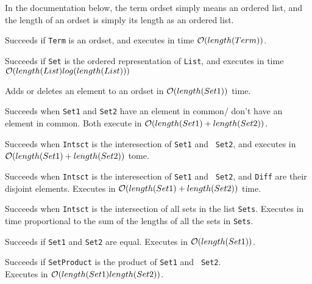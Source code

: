 In the documentation below, the term ordset simply means an ordered
list, and the length of an ordset is simply its length as an ordered
list.

\begin{description}
%
  Succeeds if {\tt Term} is an ordset, and executes in time
  ${\cal O}(length(Term))$.
  
%
Succeeds if {\tt Set} is the ordered representation of {\tt List}, and
executes in time ${\cal O}(length(List)log(length(List)))$

%
Adds or deletes an element to an ordset in  ${\cal O}(length(Set1))$
 time.

%
Succeeds when {\tt Set1} and {\tt Set2} have an element in common/
don't have an element in common.  Both execute in ${\cal O}(length(Set1) +
length(Set2))$.

%
Succeeds when {\tt Intsct} is the interesection of {\tt Set1} and {\tt
  Set2}, and executes in ${\cal O}(length(Set1) + length(Set2))$ tome.

%
Succeeds when {\tt Intsct} is the interesection of {\tt Set1} and {\tt
  Set2}, and {\tt Diff} are their disjoint elements.  Executes in
${\cal O}(length(Set1) + length(Set2))$ time.

%
Succeeds when {\tt Intsct} is the intersection of all sets in the list
{\tt Sets}.  Executes in time proportional to the sum of the lengths
of all the sets in {\tt Sets}.

%
Succeeds if {\tt Set1} and {\tt Set2} are equal. Executes in
${\cal O}(length(Set1))$.

%
Succeeds if {\tt SetProduct} is the product of {\tt Set1} and {\tt
  Set2}.\\  Executes in ${\cal O}(length(Set1)length(Set2))$.
  

\end{description}
